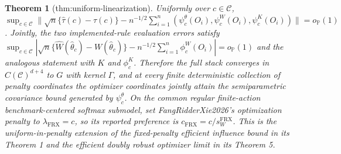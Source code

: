 \documentclass{article}
\newtheorem{theorem}{Theorem}
\begin{document}
\begin{theorem}[thm:uniform-linearization]\label{thm:uniform-linearization}
Uniformly over \(c\in\mathcal C\), \(\sup_{c\in\mathcal C}\|\sqrt n\{\widehat\tau(c)-\tau(c)\}-n^{-1/2}\sum_{i=1}^n(\psi^\theta_c(O_i),\psi^W_c(O_i),\psi^K_c(O_i))\|=o_{\mathbb P}(1)\). Jointly, the two implemented-rule evaluation errors satisfy \(\sup_{c\in\mathcal C}|\sqrt n\{\widehat W(\widehat\theta_c)-W(\widehat\theta_c)\}-n^{-1/2}\sum_{i=1}^n\phi^W_c(O_i)|=o_{\mathbb P}(1)\) and the analogous statement with \(K\) and \(\phi^K_c\). Therefore the full stack converges in \(C(\mathcal C)^{d+4}\) to \(G\) with kernel \(\Gamma\), and at every finite deterministic collection of penalty coordinates the optimizer coordinates jointly attain the semiparametric covariance bound generated by \(\psi_c^\theta\). On the common regular finite-action benchmark-centered softmax submodel, set FangRidderXie2026's optimization penalty to \(\lambda_{\mathrm{FRX}}=c\), so its reported preference is \(c_{\mathrm{FRX}}=c/s_W^{\mathrm{FRX}}\). This is the uniform-in-penalty extension of the fixed-penalty efficient influence bound in its Theorem 1 and the efficient doubly robust optimizer limit in its Theorem 5.
\end{theorem}
\end{document}
